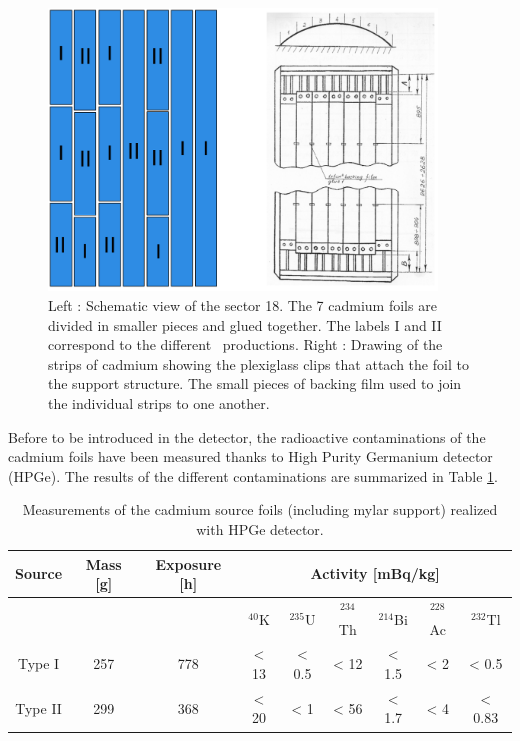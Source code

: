 \documentclass[main.tex]{subfiles}
\begin{document}
\bigskip


\begin{figure}[h!]
\includegraphics[height=7.5cm]{pictures/Chap6/schemaFoil_v2.pdf}
\centering
\caption{Left : Schematic view of the sector 18. The 7 cadmium foils are divided in smaller pieces and glued together. The labels I and II correspond to the different \Cd~productions. Right : Drawing of the strips of cadmium showing the plexiglass clips that attach the foil to the support structure. The small pieces of backing film used to join the individual strips to one another.}
\label{CdFoil}
\end{figure}


\NI Before to be introduced in the detector, the radioactive contaminations of the cadmium foils have been measured thanks to High Purity Germanium detector (HPGe). The results of the different contaminations are summarized in Table \ref{TableContaminationMeasurements}.


\bigskip


\begin{table}[h!]
\begin{center}
\begin{tabular}{c|c|c|c|c|c|c|c|c}
   \toprule
   Source  & Mass [g] & Exposure [h] &\multicolumn{6}{c|}{Activity [mBq/kg]} \\
   \midrule[0.05cm]
           &          &              & $^{\text{40}}$K &  $^{\text{235}}$U &  $^{\text{234}}$Th & $^{\text{214}}$Bi  & $^{\text{228}}$Ac & $^{\text{232}}$Tl \\[0.1cm]
   Type I  & 257      & 778          & < 13     & < 0.5      & < 12        & < 1.5                  & < 2        & < 0.5 \\
   Type II & 299      & 368          & < 20     & < 1        & < 56        & < 1.7                  & < 4        & < 0.83 \\
   \bottomrule
\end{tabular}
\caption{Measurements of the cadmium source foils (including mylar support) realized with HPGe detector.}
\label{TableContaminationMeasurements}
\end{center}
\end{table}
\end{document}
